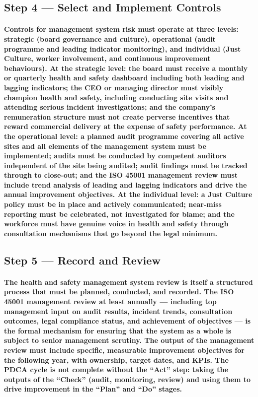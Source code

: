 \subsection{Step 4 --- Select and Implement Controls}
\paragraph{Controls for management system risk must operate at three levels: strategic (board governance and culture), operational (audit programme and leading indicator monitoring), and individual (Just Culture, worker involvement, and continuous improvement behaviours). At the strategic level: the board must receive a monthly or quarterly health and safety dashboard including both leading and lagging indicators; the CEO or managing director must visibly champion health and safety, including conducting site visits and attending serious incident investigations; and the company's remuneration structure must not create perverse incentives that reward commercial delivery at the expense of safety performance. At the operational level: a planned audit programme covering all active sites and all elements of the management system must be implemented; audits must be conducted by competent auditors independent of the site being audited; audit findings must be tracked through to close-out; and the ISO 45001 management review must include trend analysis of leading and lagging indicators and drive the annual improvement objectives. At the individual level: a Just Culture policy must be in place and actively communicated; near-miss reporting must be celebrated, not investigated for blame; and the workforce must have genuine voice in health and safety through consultation mechanisms that go beyond the legal minimum.}

\subsection{Step 5 --- Record and Review}
\paragraph{The health and safety management system review is itself a structured process that must be planned, conducted, and recorded. The ISO 45001 management review at least annually --- including top management input on audit results, incident trends, consultation outcomes, legal compliance status, and achievement of objectives --- is the formal mechanism for ensuring that the system as a whole is subject to senior management scrutiny. The output of the management review must include specific, measurable improvement objectives for the following year, with ownership, target dates, and KPIs. The PDCA cycle is not complete without the ``Act'' step: taking the outputs of the ``Check'' (audit, monitoring, review) and using them to drive improvement in the ``Plan'' and ``Do'' stages.}

